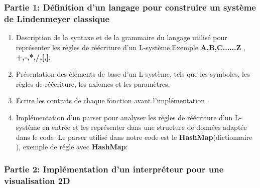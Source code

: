 \subsubsection{Partie 1: Définition d'un langage pour construire un système de Lindenmeyer classique}

\begin{enumerate}
    \item Description de la syntaxe et de la grammaire du langage utilisé pour représenter les règles de réécriture d'un L-système.Exemple \textbf{A,B,C......Z} , \textbf{+,-,*,/,[,]};
    \item   Présentation des éléments de base d'un L-système, tels que les symboles, les règles de réécriture, les axiomes et les paramètres.
    \item Ecrire les contrats de chaque fonction avant l'implémentation .
    \item  \label{hash} Implémentation d'un parser pour analyser les règles de réécriture d'un L-système en entrée et les représenter dans une structure de données adaptée dans le code .Le parser utilisé dans notre code est le \textbf{HashMap}(dictionnaire ), exemple de régle avec \textbf{HashMap}:\\
    
\begin{center}
\end{center}
   
\end{enumerate}
    
   

\subsubsection{Partie 2: Implémentation d'un interpréteur pour une visualisation 2D}

